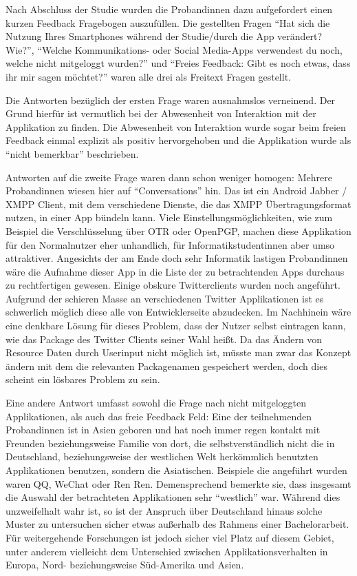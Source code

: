 Nach Abschluss der Studie wurden die Probandinnen dazu aufgefordert einen kurzen Feedback Fragebogen auszufüllen.
Die gestellten Fragen "`Hat sich die Nutzung Ihres Smartphones während der Studie/durch die App verändert? Wie?"', "`Welche Kommunikations- oder Social Media-Apps verwendest du noch, welche nicht mitgeloggt wurden?"' und "`Freies Feedback: Gibt es noch etwas, dass ihr mir sagen möchtet?"' waren alle drei als Freitext Fragen gestellt.
\par
Die Antworten bezüglich der ersten Frage waren ausnahmslos verneinend.
Der Grund hierfür ist vermutlich bei der Abwesenheit von Interaktion mit der Applikation zu finden.
Die Abwesenheit von Interaktion wurde sogar beim freien Feedback einmal explizit als positiv hervorgehoben und die Applikation wurde als "`nicht bemerkbar"' beschrieben.
\par
Antworten auf die zweite Frage waren dann schon weniger homogen:
Mehrere Probandinnen wiesen hier auf "`Conversations"' hin. 
Das ist ein Android Jabber / XMPP Client, mit dem verschiedene Dienste, die das XMPP Übertragungsformat nutzen, in einer App bündeln kann.
Viele Einstellungsmöglichkeiten, wie zum Beispiel die Verschlüsselung über OTR oder OpenPGP, machen diese Applikation für den Normalnutzer eher unhandlich, für Informatikstudentinnen aber umso attraktiver.
Angesichts der am Ende doch sehr Informatik lastigen Probandinnen wäre die Aufnahme dieser App in die Liste der zu betrachtenden Apps durchaus zu rechtfertigen gewesen.
Einige obskure Twitterclients wurden noch angeführt.
Aufgrund der schieren Masse an verschiedenen Twitter Applikationen ist es schwerlich möglich diese alle von Entwicklerseite abzudecken. 
Im Nachhinein wäre eine denkbare Lösung für dieses Problem, dass der Nutzer selbst eintragen kann, wie das Package des Twitter Clients seiner Wahl heißt.
Da das Ändern von Resource Daten durch Userinput nicht möglich ist, müsste man zwar das Konzept ändern mit dem die relevanten Packagenamen gespeichert werden, doch dies scheint ein lösbares Problem zu sein.
\par
Eine andere Antwort umfasst sowohl die Frage nach nicht mitgeloggten Applikationen, als auch das freie Feedback Feld:
Eine der teilnehmenden Probandinnen ist in Asien geboren und hat noch immer regen kontakt mit Freunden beziehungsweise Familie von dort, 
die selbstverständlich nicht die in Deutschland, beziehungsweise der westlichen Welt herkömmlich benutzten Applikationen benutzen, sondern die Asiatischen.
Beispiele die angeführt wurden waren QQ, WeChat oder Ren Ren.
Demensprechend bemerkte sie, dass insgesamt die Auswahl der betrachteten Applikationen sehr "`westlich"' war.
Während dies unzweifelhalt wahr ist, so ist der Anspruch über Deutschland hinaus solche Muster zu untersuchen sicher etwas außerhalb des Rahmens einer Bachelorarbeit.
Für weitergehende Forschungen ist jedoch sicher viel Platz auf diesem Gebiet, unter anderem vielleicht dem Unterschied zwischen Applikationsverhalten in Europa, Nord- beziehungsweise Süd-Amerika und Asien. 
\par

